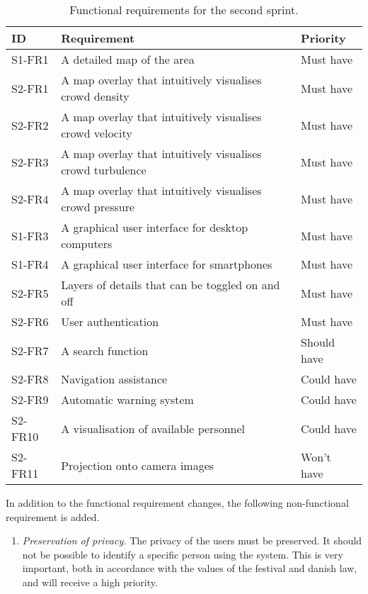 \begin{table}[h!]
	\centering
	\begin{tabularx}{\textwidth}{lXl}
		\toprule
		\textbf{ID} & \textbf{Requirement} & \textbf{Priority} \\
		\midrule 
		\rowcolor[HTML]{EFEFEF} 
		S1-FR1 & A detailed map of the area & Must have \\
		S2-FR1 & A map overlay that intuitively visualises crowd density & Must have \\
		\rowcolor[HTML]{EFEFEF} 
		S2-FR2 & A map overlay that intuitively visualises crowd velocity & Must have \\
		S2-FR3 & A map overlay that intuitively visualises crowd turbulence & Must have \\
		\rowcolor[HTML]{EFEFEF} 
		S2-FR4 & A map overlay that intuitively visualises crowd pressure & Must have \\
		S1-FR3 & A graphical user interface for desktop computers & Must have \\
		\rowcolor[HTML]{EFEFEF} 
		S1-FR4 & A graphical user interface for smartphones & Must have \\
		S2-FR5 & Layers of details that can be toggled on and off & Must have \\
		\rowcolor[HTML]{EFEFEF} 
		S2-FR6 & User authentication & Must have \\
		S2-FR7 & A search function & Should have \\
		\rowcolor[HTML]{EFEFEF} 
		S2-FR8 & Navigation assistance & Could have \\
		S2-FR9 & Automatic warning system & Could have \\
		\rowcolor[HTML]{EFEFEF} 
		S2-FR10 & A visualisation of available personnel & Could have \\
		S2-FR11 & Projection onto camera images & Won't have \\
		\bottomrule
	\end{tabularx}
	\caption{Functional requirements for the second sprint.}
	\label{tab:s2_req}
\end{table}

In addition to the functional requirement changes, the following non-functional requirement is added.

\begin{enumerate}
    \item \emph{Preservation of privacy.} The privacy of the users must be preserved. It should not be possible to identify a specific person using the system. This is very important, both in accordance with the values of the festival and danish law, and will receive a high priority.
\end{enumerate}

